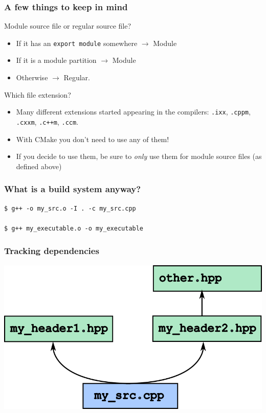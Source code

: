 \documentclass[aspectratio=169]{beamer}
\newif\iftransitions
\newcommand{\cpause}{\iftransitions \pause \fi}
\begin{document}
\begin{frame}[fragile]

  \frametitle{A few things to keep in mind}
  
  Module source file or regular source file?
  \begin{itemize}
  \item If it has an \texttt{export module} somewhere $\rightarrow$ Module
  \item If it is a module partition $\rightarrow$ Module
  \item Otherwise $\rightarrow$ Regular.
  \end{itemize}

  \cpause
  Which file extension?
  \begin{itemize}
  \item Many different extensions started appearing in the compilers: \texttt{.ixx}, \texttt{.cppm}, \texttt{.cxxm}, \texttt{.c++m}, \texttt{.ccm}.
  \item With CMake you don't need to use any of them!
  \item If you decide to use them, be sure to \textit{only} use them for module source files (as defined above)
  \end{itemize}
\end{frame}

%

\begin{frame}[fragile]
  \frametitle{What is a build system anyway?}

  \begin{lstlisting}
$ g++ -o my_src.o -I . -c my_src.cpp

$ g++ my_executable.o -o my_executable
  \end{lstlisting}
\end{frame}

\begin{frame}

  \frametitle{Tracking dependencies}

  \includegraphics[height=.75\textheight]{modulesgfx/headers_dep_001.png}
\end{frame}
\end{document}
